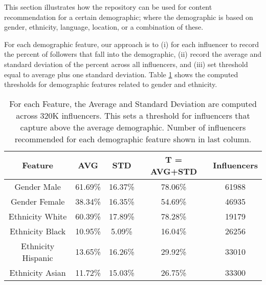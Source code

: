This section illustrates how the repository can be used for content recommendation for a certain demographic; where the demographic is based on gender, ethnicity, language, location, or a combination of these. 

For each demographic feature, our approach is to (i) for each influencer to record the percent of followers that fall into the demographic, (ii) record the average and standard deviation of the percent across all influencers, and (iii) set threshold equal to average plus one standard deviation. Table \ref{table_summaryFeatures_app2} shows the computed thresholds for demographic features related to gender and ethnicity.

\begin{table}
\small
\caption[Demographic Feature Ranges for Gender and Ethnicity]{For each Feature, the Average and Standard Deviation are computed across 320K influencers. This sets a threshold for influencers that capture above the average demographic. Number of influencers recommended for each demographic feature shown in last column.}
\label{table_summaryFeatures_app2}
\begin{center}
\begin{tabular}{|c|c|c|c|c|}
\hline
\bfseries Feature & \bfseries AVG & \bfseries STD & \bfseries T = AVG+STD & \bfseries Influencers\\
\hline
Gender Male & 61.69\% & 16.37\% & 78.06\% & 61988 \\
\hline
Gender Female & 38.34\% & 16.35\% & 54.69\% & 46935 \\
\hline
Ethnicity White & 60.39\% & 17.89\% & 78.28\% & 19179 \\
\hline
Ethnicity Black & 10.95\% & 5.09\% & 16.04\% & 26256 \\
\hline
Ethnicity Hispanic & 13.65\% & 16.26\% & 29.92\% & 33010 \\
\hline
Ethnicity Asian & 11.72\% & 15.03\% & 26.75\% & 33300 \\
\hline
\end{tabular}
\end{center}
\end{table}

